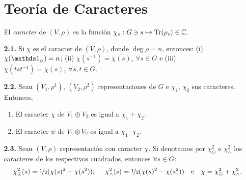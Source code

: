 \section{Teoría de Caracteres}

\begin{definition}
    El \emph{caracter} de \((V,\rho)\) es la función \(\chi_\rho:G \ni s \mapsto \operatorname{Tr}(\rho_s) \in \mathbb{C}\). 
\end{definition}

\hypertarget{prop21}{}
\begin{proposition}
    \textbf{2.1.} Si \(\chi\) es el caracter de \((V, \rho)\), donde \(\deg \rho= n\), entonces: (i) \(\chi(\id_{_G}) = n\); (ii) \(\chi(s^{-1}) = \overline{\chi(s)}, \ \forall s \in G\) e (iii) \(\chi(tst^{-1}) = \chi(s), \ \forall s,t \in G\). 
\end{proposition}


\hypertarget{prop22}{}
\begin{proposition}
    \textbf{2.2.} Sean \((V_1, \rho^1)\), \((V_2, \rho^2)\) representaciones de \(G\) e \(\chi_1\), \(\chi_2\) sus caracteres. Entonces,
    \vspace{-0.8cm}
    \begin{enumerate}[label = \roman*., left = 0.35cm]
        \item El caracter \(\chi\) de \(V_1 \oplus V_2\) es igual a \(\chi_1 + \chi_2\). 
        \item El caracter \(\psi\) de \(V_1 \otimes V_2\) es igual a \(\chi_1 \cdot \chi_2\). 
    \end{enumerate}
\end{proposition}

\begin{proposition}
    \textbf{2.3.} Sean \((V,\rho)\) representación con caracter \(\chi\). Si denotamos por \(\chi_{\odot}^2\) e \(\chi_{\wedge}^2\) los caracteres de los respectivos cuadrados, entonces \(\forall s \in G\): 
    \[\chi^2_\odot (s) = \nicefrac{1}{2} (\chi(s)^2 + \chi(s^2));  \  \ \ \ \chi^2_\wedge(s) = \nicefrac{1}{2}(\chi(s)^2 - \chi(s^2)) \ \ \ \text{e} \ \ \ \chi = \chi_\odot^2 + \chi_\wedge^2.\]
\end{proposition}

